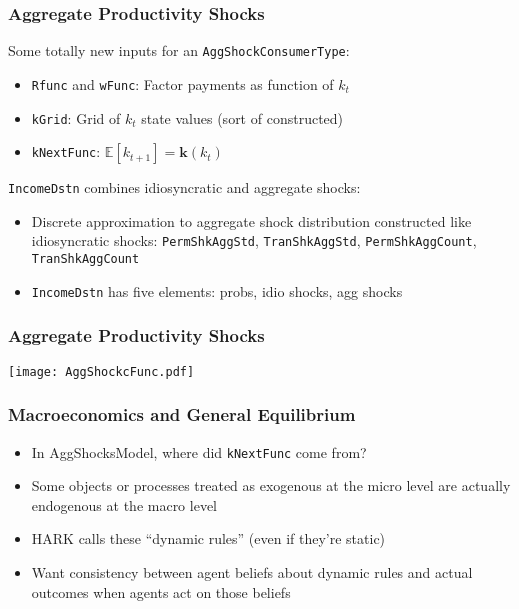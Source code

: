 \documentclass[11pt]{cfpbpresentation}
\newcommand{\E}{\mathbb{E}}
\begin{document}
\begin{frame}
\frametitle{Aggregate Productivity Shocks}
Some totally new inputs for an \texttt{AggShockConsumerType}:
\begin{itemize}
\item \texttt{Rfunc} and \texttt{wFunc}: Factor payments as function of $k_t$

\item \texttt{kGrid}: Grid of $k_t$ state values (sort of constructed)

\item \texttt{kNextFunc}: $\E[k_{t+1}] = \mathbf{k}(k_t)$
\end{itemize}

\texttt{IncomeDstn} combines idiosyncratic and aggregate shocks:
\begin{itemize}
\item Discrete approximation to aggregate shock distribution constructed like idiosyncratic shocks: \texttt{PermShkAggStd}, \texttt{TranShkAggStd}, \texttt{PermShkAggCount}, \texttt{TranShkAggCount}

\item \texttt{IncomeDstn} has five elements: probs, idio shocks, agg shocks
\end{itemize}
\end{frame}

\begin{frame}
\frametitle{Aggregate Productivity Shocks}
\begin{center}
\texttt{[image: AggShockcFunc.pdf]}
\end{center}
\end{frame}

\begin{frame}
\frametitle{Macroeconomics and General Equilibrium}

\begin{itemize}
\item In AggShocksModel, where did \texttt{kNextFunc} come from?

\item Some objects or processes treated as exogenous at the micro level are actually endogenous at the macro level

\item HARK calls these ``dynamic rules'' (even if they're static)

\item Want consistency between agent beliefs about dynamic rules and actual outcomes when agents act on those beliefs
\end{itemize}
\end{frame}
\end{document}
